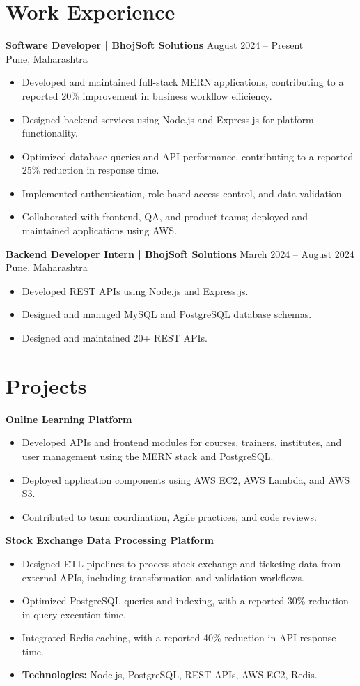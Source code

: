 \documentclass[a4paper,10pt]{article}
\begin{document}
\section*{Work Experience}
\textbf{Software Developer | BhojSoft Solutions} \hfill August 2024 -- Present\\
Pune, Maharashtra
\begin{itemize}
  \item Developed and maintained full-stack MERN applications, contributing to a reported 20\% improvement in business workflow efficiency.
  \item Designed backend services using Node.js and Express.js for platform functionality.
  \item Optimized database queries and API performance, contributing to a reported 25\% reduction in response time.
  \item Implemented authentication, role-based access control, and data validation.
  \item Collaborated with frontend, QA, and product teams; deployed and maintained applications using AWS.
\end{itemize}

\textbf{Backend Developer Intern | BhojSoft Solutions} \hfill March 2024 -- August 2024\\
Pune, Maharashtra
\begin{itemize}
  \item Developed REST APIs using Node.js and Express.js.
  \item Designed and managed MySQL and PostgreSQL database schemas.
  \item Designed and maintained 20+ REST APIs.
\end{itemize}

\section*{Projects}
\textbf{Online Learning Platform}
\begin{itemize}
  \item Developed APIs and frontend modules for courses, trainers, institutes, and user management using the MERN stack and PostgreSQL.
  \item Deployed application components using AWS EC2, AWS Lambda, and AWS S3.
  \item Contributed to team coordination, Agile practices, and code reviews.
\end{itemize}

\textbf{Stock Exchange Data Processing Platform}
\begin{itemize}
  \item Designed ETL pipelines to process stock exchange and ticketing data from external APIs, including transformation and validation workflows.
  \item Optimized PostgreSQL queries and indexing, with a reported 30\% reduction in query execution time.
  \item Integrated Redis caching, with a reported 40\% reduction in API response time.
  \item \textbf{Technologies:} Node.js, PostgreSQL, REST APIs, AWS EC2, Redis.
\end{itemize}
\end{document}
